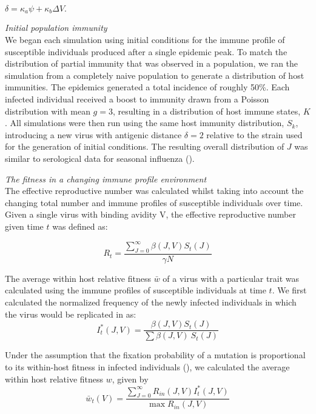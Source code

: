 \documentclass[12pt,a4paper]{article}
\begin{document}
$\delta =\kappa_{a} \psi+\kappa_{b} \Delta V.$

\textit{Initial population immunity} \\
We began each simulation using initial conditions for the immune profile of susceptible individuals produced after a single epidemic peak. To match the distribution of partial immunity that was observed in a population, we ran the simulation from a completely naive population to generate a distribution of host immunities. The epidemics generated a total incidence of roughly 50\%. Each infected individual received a boost to immunity drawn from a Poisson distribution with mean $g=3$, resulting in a distribution of host immune states, $K$. All simulations were then run using the same host immunity distribution, $S_{k}$, introducing a new virus with antigenic distance $\delta =2$ relative to the strain used for the generation of initial conditions. The resulting overall distribution of $J$ was similar to serological data for seasonal influenza (\cite{Yuan2016}).

\textit{The fitness in a changing immune profile environment} \\
The effective reproductive number was calculated whilst taking into account the changing total number and immune profiles of susceptible individuals over time. Given a single virus with binding avidity V, the effective reproductive number given time $t$ was defined as:

\begin{equation}
R_{t}=\frac{\sum_{J=0}^{\infty}\beta(J,V)S_{t}(J)}{\gamma N}
\end{equation}

The average within host relative fitness $\bar{w}$ of a virus with a particular trait was calculated using the immune profiles of susceptible individuals at time $t$. We first calculated the normalized frequency of the newly infected individuals in which the virus would be replicated in as:
\begin{equation}
I_{t}^*(J,V)=\frac{\beta(J,V) S_{t}(J) }{\sum \beta(J,V)\ S_{t}(J)}
\end{equation}

Under the assumption that the fixation probability of a mutation is proportional to its within-host fitness in infected individuals (\cite{Gillespie1984}), we calculated the average within host relative fitness $w$, given by
\begin{equation}
\bar{w}_{t}(V)=\frac{\sum_{J=0}^{\infty} R_{in}(J,V)I_{t}^*(J,V)}{\max{R_{in}(J,V)}}
\end{equation}
\clearpage
\end{document}

